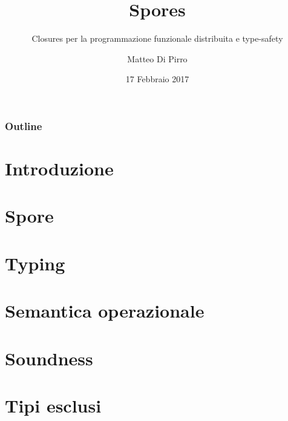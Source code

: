 \documentclass{beamer}
\title{Spores}
\subtitle{\newline Closures per la programmazione funzionale distribuita e type-safety}
\author{Matteo Di Pirro}
\date{17 Febbraio 2017}
\institute{Università degli Studi di Padova}
\begin{document}
\newcommand{\turnOffNumbers}{true} %

\begin{frame}[noframenumbering]
\titlepage
\end{frame}

\let\turnOffNumbers\empty
\begin{frame}
	\frametitle{Outline}
	\tableofcontents
\end{frame}

\section{Introduzione}


\section{Spore}




\section{Typing}



\section{Semantica operazionale}

\section{Soundness}

\section{Tipi esclusi}

\appendix
\makethanks
\renewcommand{\turnOffNumbers}{true} %
\end{document}
